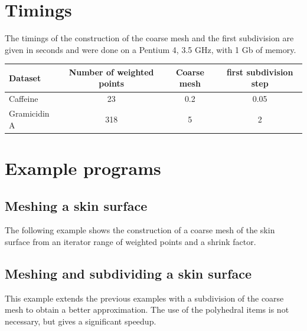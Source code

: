 %

\section{Timings}
The timings of the construction of the coarse mesh and the first
subdivision are given in seconds and were done on a Pentium 4, 3.5
GHz, with 1 Gb of memory.
\begin{center}
  \begin{tabular}{|l|c|c|c|}
    \hline
    Dataset & Number of weighted points & Coarse mesh & first subdivision step\\
    \hline
    \hline
    Caffeine& 23 & 0.2 & 0.05 \\
    Gramicidin A& 318 & 5 & 2\\
    \hline
  \end{tabular}
\end{center}

\section{Example programs}
\subsection{Meshing a skin surface}
The following example shows the construction of a coarse mesh of the
skin surface from an iterator range of weighted points and a shrink factor.

\subsection{Meshing and subdividing a skin surface}
This example extends the previous examples with a subdivision of the
coarse mesh to obtain a better approximation. The use of the
polyhedral items is not necessary, but gives a significant speedup.



